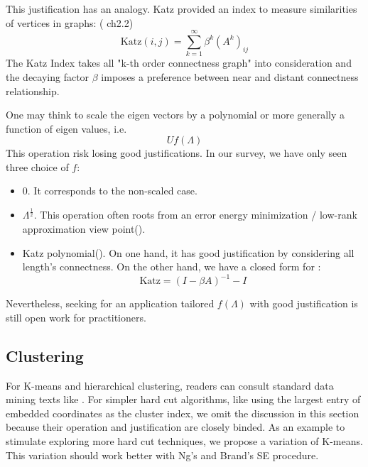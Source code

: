 This justification has an analogy. Katz\cite{katz1953catzindex}
provided an index to measure similarities of vertices in graphs:
(\cite{aggarwal2011social} ch2.2)
\begin{equation}
	\text{Katz}(i,j) = \sum_{k=1}^{\infty}{\beta^k (A^k)_{ij}}
	\label{eq:katz}
\end{equation}
The Katz Index takes all "k-th order connectness graph" into consideration
and the decaying factor $ \beta $ imposes 
a preference between near and distant connectness
relationship. 

One may think to scale the eigen vectors by a polynomial or 
more generally a function of eigen values, i.e.
\begin{equation}
	U f(\Lambda)
\end{equation}
This operation risk losing good justifications. In our survey, 
we have only seen three choice of $ f $:
\begin{itemize}
	\item 0. It corresponds to the non-scaled case. 
	\item $ \Lambda^{\frac{1}{2}} $. This operation often roots 
	from an error energy minimization / low-rank approximation
	view point(\rsec{\ref{sec:lrapprox}}).
	\item Katz polynomial(\req{\ref{eq:katz}}). On one hand, 
	it has good justification by considering all length's 
	connectness. On the other hand, we have a closed form for 
	\req{\ref{eq:katz}}:\cite{aggarwal2011social}
		\begin{equation}
			\text{Katz} = (I - \beta A)^{-1} - I
		\end{equation}
\end{itemize}
Nevertheless, seeking for an application tailored $ f(\Lambda) $
with good justification is still open work for practitioners. 

\subsection{Clustering}

For K-means and hierarchical clustering, readers
can consult standard data mining texts like \cite{jiawei2001data}.
For simpler hard cut algorithms, like using the 
largest entry of embedded coordinates as the cluster index, 
we omit the discussion in this section because their operation 
and justification are closely binded. As an example 
to stimulate exploring more hard cut techniques, we propose 
a variation of K-means. This variation should work better with 
Ng's \cite{ng2002spectral} and Brand's \cite{brand2003unifying} 
SE procedure. 

